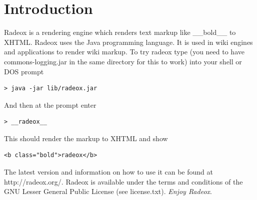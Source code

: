 \documentclass[a4paper,pdftex]{article}
\begin{document}
  
  \thispagestyle{empty}

  {\raggedleft{}
 
   }
 
  \newpage
  \pagestyle{empty}
  \tableofcontents
  \newpage
  \pagestyle{fancy}

\section{Introduction}

Radeox is a  rendering engine which renders text markup like
\_\_bold\_\_ to XHTML. Radeox uses the Java programming
language. It is used in wiki engines and 
applications  to render wiki markup. To try radeox type (you need to have commons-logging.jar in the same directory for 
this to work) into your shell or DOS prompt

\begin{verbatim}
> java -jar lib/radeox.jar
\end{verbatim}

And then at the prompt enter

\begin{verbatim}
> __radeox__
\end{verbatim}

This should render the markup to XHTML and show
\begin{verbatim}
<b class="bold">radeox</b>
\end{verbatim}

The latest version and information on how to use it can be found at http://radeox.org/.
Radeox is available under the terms and conditions of the GNU
Lesser General Public License (see license.txt). {\it Enjoy Radeox}.
\end{document}
